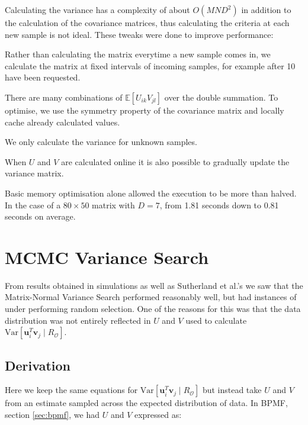 Calculating the variance has a complexity of about $O(MND^2)$ in addition to the calculation of the covariance matrices, thus calculating the criteria at each new sample is not ideal. These tweaks were done to improve performance: 

\begin{description}[style=standard,leftmargin=.7cm,font=\bfseries]
  \item[Variance Matrix Calculation Update] Rather than calculating the matrix everytime a new sample comes in, we calculate the matrix at fixed intervals of incoming samples, for example after 10 have been requested.
  \item[Memory Optimisation] There are many combinations of $\mathbb{E}[U_{ik}V_{jl}]$ over the double summation. To optimise, we use the symmetry property of the covariance matrix and locally cache already calculated values.
  \item[Unknown Samples] We only calculate the variance for unknown samples.
  \item[Online Updating] When $U$ and $V$ are calculated online it is also possible to gradually update the variance matrix.

\end{description}

Basic memory optimisation alone allowed the execution to be more than halved. In the case of a $80 \times 50$ matrix with $D=7$, from 1.81 seconds down to 0.81 seconds on average.


\section{MCMC Variance Search}
\label{sec:mcmcvar}
From results obtained in simulations as well as Sutherland et al.'s we saw that the Matrix-Normal Variance Search performed reasonably well, but had instances of under performing random selection. One of the reasons for this was that the data distribution was not entirely reflected in $U$ and $V$ used to calculate $\mathrm{Var}[\mathbf{u}_i^T \mathbf{v}_j \mid R_\mathcal{O}]$. 
\subsection{Derivation}
Here we keep the same equations for $\mathrm{Var}[\mathbf{u}_i^T \mathbf{v}_j \mid R_\mathcal{O}]$ but instead take $U$ and $V$ from an estimate sampled across the expected distribution of data. In BPMF, section \ref{sec:bpmf}, we had $U$ and $V$ expressed as:

